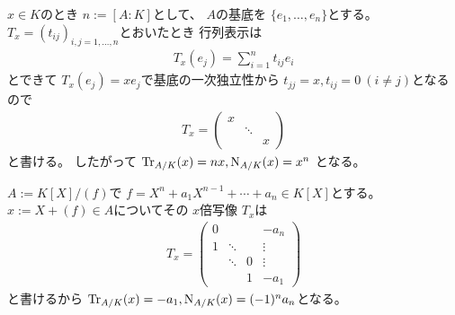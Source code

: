 \documentclass[../master_galois_theory]{subfiles}
\begin{document}
\begin{exam} \label{exam:tracenorm1}
  $x \in K$のとき $n := [A:K]$として、
  $A$の基底を $\{ e_1 , \dots , e_n \}$とする。
  $T_x = (t_{ij})_{i,j = 1 , \dots , n}$とおいたとき
  行列表示は
  \begin{eqnarray*}
    T_x (e_j) = \sum_{i=1}^n t_{ij} e_i
  \end{eqnarray*}
  とできて $T_x (e_j) = xe_j$で基底の一次独立性から
  $t_{jj} = x , t_{ij} = 0 \  (i \neq j)$となるので
  \begin{eqnarray*}
    T_x =
    \begin{pmatrix}
      x &        &   \\
        & \ddots &  \\
        &        &  x
    \end{pmatrix}
  \end{eqnarray*}
  と書ける。
  したがって
  $\mathrm{Tr}_{A/K}(x) = nx , \mathrm{N}_{A/K}(x) = x^n$
  となる。
\end{exam}

\begin{exam} \label{exam:tracenorm2}
  $A := K[X]/(f)$で $f = X^n + a_1 X^{n-1} + \cdots + a_n \in K[X]$とする。
  $x := X + (f) \in A$についてその $x$倍写像 $T_x$は
  \begin{eqnarray*}
    T_x =
    \begin{pmatrix}
      0 &        &   & - a_n \\
      1 & \ddots &   & \vdots \\
        & \ddots & 0 & \vdots \\
        &        & 1 & - a_1
    \end{pmatrix}
  \end{eqnarray*}
  と書けるから
  $\mathrm{Tr}_{A/K}(x) = -a_1 , \mathrm{N}_{A/K}(x) = (-1)^n a_n$となる。
\end{exam}
\end{document}
